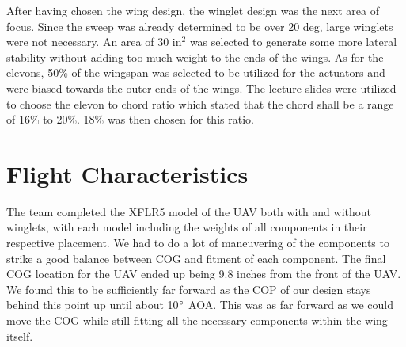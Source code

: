     After having chosen the wing design, the winglet design was the next area of focus. Since the sweep was already determined to be over 20 deg, large winglets were not necessary. An area of 30 in$^2$ was selected to generate some more lateral stability without adding too much weight to the ends of the wings. As for the elevons, 50\% of the wingspan was selected to be utilized for the actuators and were biased towards the outer ends of the wings. The lecture slides were utilized to choose the elevon to chord ratio which stated that the chord shall be a range of 16\% to 20\%. 18\% was then chosen for this ratio.


\section{Flight Characteristics}

The team completed the XFLR5 model of the UAV both with and without winglets, with each model including the weights of all components in their respective placement. We had to do a lot of maneuvering of the components to strike a good balance between COG and fitment of each component. The final COG location for the UAV ended up being 9.8 inches from the front of the UAV. We found this to be sufficiently far forward as the COP of our design stays behind this point up until about 10$\degree$ AOA. This was as far forward as we could move the COG while still fitting all the necessary components within the wing itself. 

